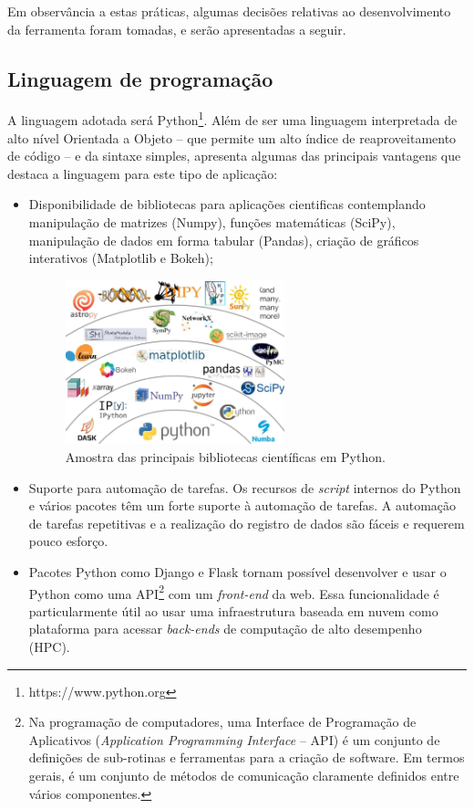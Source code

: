 Em observância a estas práticas, algumas decisões relativas ao desenvolvimento da ferramenta foram tomadas, e serão apresentadas a seguir.


\subsection{Linguagem de programação}

A linguagem adotada será Python\footnote{https://www.python.org}. Além de ser uma linguagem interpretada de alto nível Orientada a Objeto -- que permite um alto índice de reaproveitamento de código -- e da sintaxe simples,  apresenta algumas das principais vantagens que destaca a linguagem para este tipo de aplicação:

\begin{itemize}
    \item Disponibilidade de bibliotecas para aplicações cientificas contemplando manipulação de matrizes (Numpy), funções matemáticas (SciPy), manipulação de dados em forma tabular (Pandas), criação de gráficos interativos (Matplotlib e Bokeh);
    
    \begin{figure}[!ht]
        \centering
        \caption{Amostra das principais bibliotecas científicas em Python.}\label{fig:python_ecosystem}
        \includegraphics[width=0.6\textwidth]{imagens/python_ecosystem}
    \end{figure}

    \item Suporte para automação de tarefas. Os recursos de \textit{script} internos do Python e vários pacotes têm um forte suporte à automação de tarefas. A automação de tarefas repetitivas e a realização do registro de dados são fáceis e requerem pouco esforço.
    
    \item Pacotes Python como Django e Flask tornam possível desenvolver e usar o Python como uma API\footnote{Na programação de computadores, uma Interface de Programação de Aplicativos (\textit{Application Programming Interface} -- API) é um conjunto de definições de sub-rotinas e ferramentas para a criação de software. Em termos gerais, é um conjunto de métodos de comunicação claramente definidos entre vários componentes.} com um \textit{front-end} da web. Essa funcionalidade é particularmente útil ao usar uma infraestrutura baseada em nuvem como plataforma para acessar \textit{back-ends} de computação de alto desempenho (HPC).
\end{itemize}


